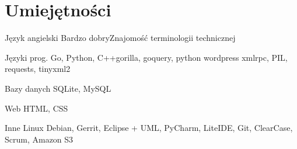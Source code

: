 \documentclass[11pt,a4paper,sans,polish]{moderncv}   %
\begin{document}


\section{Umiejętności}

\cvitemwithcomment
	{Język angielski}
	{Bardzo dobry}{Znajomość terminologii technicznej}

\cvitemwithcomment
	{Języki prog.}
	{Go, Python, C++}{gorilla, goquery, python wordpress xmlrpc, PIL, requests, tinyxml2}

\cvitemwithcomment
	{Bazy danych}
	{SQLite, MySQL}{}

\cvitemwithcomment
	{Web}
	{HTML, CSS}{}

\cvitemwithcomment
	{Inne}
	{Linux Debian, Gerrit, Eclipse \small{+ UML}, PyCharm, LiteIDE, Git, ClearCase, Scrum, Amazon S3}{}


\vspace{0.5cm}

\begin{cvcolumns}
\end{cvcolumns}


\thispagestyle{zgoda}
\end{document}
